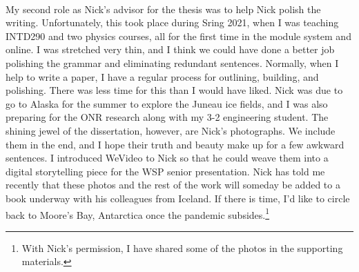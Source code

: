 \documentclass[../../../main.tex]{subfiles}
\begin{document}
\\
\vspace{0.25cm}
My second role as Nick's advisor for the thesis was to help Nick polish the writing.  Unfortunately, this took place during Sring 2021, when I was teaching INTD290 and two physics courses, all for the first time in the module system and online.  I was stretched very thin, and I think we could have done a better job polishing the grammar and eliminating redundant sentences.  Normally, when I help to write a paper, I have a regular process for outlining, building, and polishing.  There was less time for this than I would have liked.  Nick was due to go to Alaska for the summer to explore the Juneau ice fields, and I was also preparing for the ONR research along with my 3-2 engineering student.  The shining jewel of the dissertation, however, are Nick's photographs.  We include them in the end, and I hope their truth and beauty make up for a few awkward sentences.  I introduced WeVideo to Nick so that he could weave them into a digital storytelling piece for the WSP senior presentation.  Nick has told me recently that these photos and the rest of the work will someday be added to a book underway with his colleagues from Iceland.  If there is time, I'd like to circle back to Moore's Bay, Antarctica once the pandemic subsides.\footnote{With Nick's permission, I have shared some of the photos in the supporting materials.}
\end{document}

